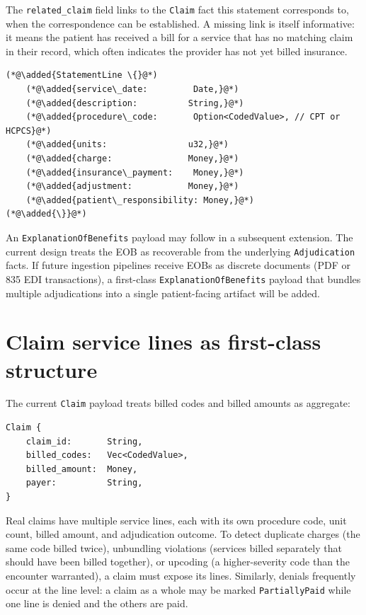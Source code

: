 \documentclass[11pt]{article}
\newcommand{\added}[1]{\textcolor{accentblue}{#1}}
\begin{document}
The \texttt{related\_claim} field links to the \texttt{Claim} fact this
statement corresponds to, when the correspondence can be established. A
missing link is itself informative: it means the patient has received a
bill for a service that has no matching claim in their record, which
often indicates the provider has not yet billed insurance.

\begin{lstlisting}
(*@\added{StatementLine \{}@*)
    (*@\added{service\_date:         Date,}@*)
    (*@\added{description:          String,}@*)
    (*@\added{procedure\_code:       Option<CodedValue>, // CPT or HCPCS}@*)
    (*@\added{units:                u32,}@*)
    (*@\added{charge:               Money,}@*)
    (*@\added{insurance\_payment:    Money,}@*)
    (*@\added{adjustment:           Money,}@*)
    (*@\added{patient\_responsibility: Money,}@*)
(*@\added{\}}@*)
\end{lstlisting}

An \texttt{ExplanationOfBenefits} payload may follow in a subsequent
extension. The current design treats the EOB as recoverable from the
underlying \texttt{Adjudication} facts. If future ingestion pipelines
receive EOBs as discrete documents (PDF or 835 EDI transactions), a
first-class \texttt{ExplanationOfBenefits} payload that bundles multiple
adjudications into a single patient-facing artifact will be added.

\section{Claim service lines as first-class structure}
\label{sec:claim-lines}

The current \texttt{Claim} payload treats billed codes and billed amounts
as aggregate:

\begin{lstlisting}
Claim {
    claim_id:       String,
    billed_codes:   Vec<CodedValue>,
    billed_amount:  Money,
    payer:          String,
}
\end{lstlisting}

Real claims have multiple service lines, each with its own procedure
code, unit count, billed amount, and adjudication outcome. To detect
duplicate charges (the same code billed twice), unbundling violations
(services billed separately that should have been billed together), or
upcoding (a higher-severity code than the encounter warranted), a claim
must expose its lines. Similarly, denials frequently occur at the line
level: a claim as a whole may be marked \texttt{PartiallyPaid} while one
line is denied and the others are paid.
\end{document}
